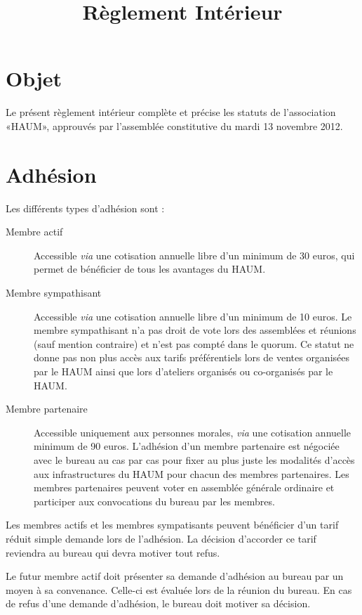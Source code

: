 \documentclass[a4paper, 11pt]{article}
\title{Règlement Intérieur}
\author{}
\date{}
\newcommand{\nomHS}{HAUM}
\newcommand{\dateAGC}{mardi 13 novembre 2012}
\newcommand{\prixNormal}{30 euros}
\newcommand{\prixSympatisant}{10 euros}
\newcommand{\prixPartenaire}{90 euros}
\begin{document}
    \maketitle

\section{Objet} %

Le présent règlement intérieur complète et précise les statuts de l'association «\nomHS», approuvés par l'assemblée
constitutive du \dateAGC{}.


\section{Adhésion} %

Les différents types d'adhésion sont :

\begin{description}
	\item[Membre actif] Accessible \textit{via} une cotisation annuelle libre d'un minimum de \prixNormal{}, qui permet de bénéficier de tous les avantages du \nomHS{}.
	\item[Membre sympathisant] Accessible \textit{via} une cotisation annuelle libre d'un minimum de \prixSympatisant{}. Le membre sympathisant n'a pas droit de vote lors des assemblées et réunions (sauf mention contraire) et n'est pas compté dans le quorum. Ce statut ne donne pas non plus accès aux tarifs préférentiels lors de ventes organisées par le \nomHS{} ainsi que lors d'ateliers organisés ou co-organisés par le \nomHS{}.
	\item[Membre partenaire] Accessible uniquement aux personnes morales, \textit{via} une cotisation annuelle minimum de \prixPartenaire{}. L'adhésion d'un membre partenaire est négociée avec le bureau au cas par cas pour fixer au plus juste les modalités d'accès aux infrastructures du \nomHS{} pour chacun des membres partenaires. Les membres partenaires peuvent voter en assemblée générale ordinaire et participer aux convocations du bureau par les membres.
\end{description}

Les membres actifs et les membres sympatisants peuvent bénéficier d'un tarif réduit simple demande lors de l'adhésion.
La décision d'accorder ce tarif reviendra au bureau qui devra motiver tout refus.

Le futur membre actif doit présenter sa demande d'adhésion au bureau par un moyen à sa convenance.
Celle-ci est évaluée lors de la réunion du bureau. En cas de refus d'une demande d'adhésion, le bureau doit motiver sa décision.
\end{document}
